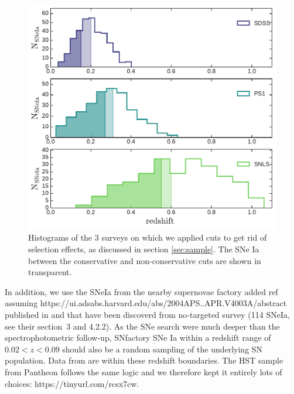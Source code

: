 \documentclass[]{aa} %
\newcommand{\nn}[1]{{\textcolor[rgb]{1, 0.27, 0}{#1}}}
\begin{document}
\begin{figure}
    \centering
    \includegraphics[width=\linewidth]{Article_figures/hist_surveys_cuts.pdf}
    \caption{Histograms of the 3 surveys on which we applied cuts to get rid of
    selection effects, as discussed in section \ref{sec:sample}. The SNe Ia
between the conservative and non-conservative cuts are shown in transparent.}
    \label{fig:cuts}
\end{figure}

In addition, we use the SNeIa from the nearby supernovae factory
\citep[SNfactory][]{aldering2004} \nn{added ref assuming
https://ui.adsabs.harvard.edu/abs/2004APS..APR.V4003A/abstract} published in
\citep{rigault2018} and that have been discoverd from no-targeted survey (114
SNeIa, see their section~3 and 4.2.2). As the SNe search were much deeper than
the spectrophotometric follow-up, SNfactory SNe Ia within a redshift range of
$0.02<z<0.09$ should also be a random sampling of the underlying SN population.
Data from \citep{rigault2018} are within these redshift boundaries. The HST
sample from Pantheon follows the same logic and we therefore kept it entirely
\citep{FIND BACK THE REF} \nn{lots of choices: https://tinyurl.com/rcsx7cw}.
\end{document}
